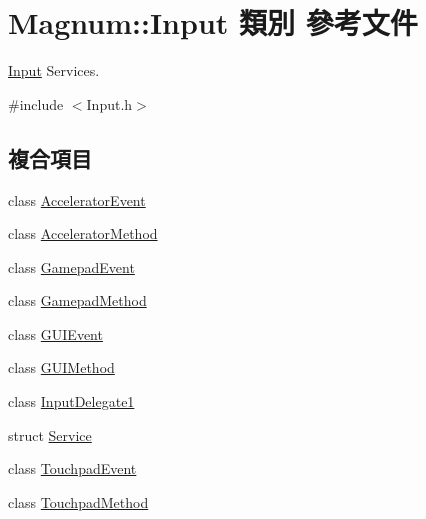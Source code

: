 \hypertarget{class_magnum_1_1_input}{}\section{Magnum\+:\+:Input 類別 參考文件}
\label{class_magnum_1_1_input}


\hyperlink{class_magnum_1_1_input}{Input} Services.  




{\ttfamily \#include $<$Input.\+h$>$}

\subsection*{複合項目}
\begin{DoxyCompactItemize}
\item 
class \hyperlink{class_magnum_1_1_input_1_1_accelerator_event}{Accelerator\+Event}
\item 
class \hyperlink{class_magnum_1_1_input_1_1_accelerator_method}{Accelerator\+Method}
\item 
class \hyperlink{class_magnum_1_1_input_1_1_gamepad_event}{Gamepad\+Event}
\item 
class \hyperlink{class_magnum_1_1_input_1_1_gamepad_method}{Gamepad\+Method}
\item 
class \hyperlink{class_magnum_1_1_input_1_1_g_u_i_event}{G\+U\+I\+Event}
\item 
class \hyperlink{class_magnum_1_1_input_1_1_g_u_i_method}{G\+U\+I\+Method}
\item 
class \hyperlink{class_magnum_1_1_input_1_1_input_delegate1}{Input\+Delegate1}
\item 
struct \hyperlink{struct_magnum_1_1_input_1_1_service}{Service}
\item 
class \hyperlink{class_magnum_1_1_input_1_1_touchpad_event}{Touchpad\+Event}
\item 
class \hyperlink{class_magnum_1_1_input_1_1_touchpad_method}{Touchpad\+Method}
\end{DoxyCompactItemize}
